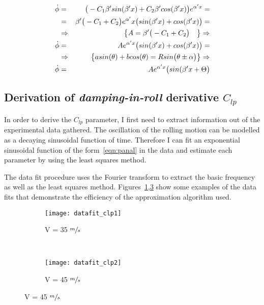 \begin{eqnarray}
    \dot{\phi} &=&   \big(-C_1 \beta' sin(\beta' x) + C_2 \beta' cos(\beta' x) \big) e^{\alpha' x} =\notag\\
     &=&  \beta'\big(-C_1+C_2\big)e^{\alpha'}x\big(sin(\beta'x) + cos(\beta'x)\big) = \notag\\
     &\Rightarrow& \big\{A = \beta' \big(-C_1+C_2\big) \quad \big\} \Rightarrow \notag\\
     \dot{\phi} &=& Ae^{\alpha'x}\big(sin(\beta'x) + cos(\beta'x)\big) \label{eqn:panal} = \notag\\
     &\Rightarrow&  \big\{asin(\theta) + bcos(\theta) = Rsin\big(\theta \pm \alpha\big)\big\}\Rightarrow \notag\\
     \dot{\phi} &=& Ae^{\alpha'x}\big(sin(\beta'x + \Theta \big) \label{eqn:panal} \label{eqn:panal}
\end{eqnarray}

\subsection{Derivation of \textit{damping-in-roll} derivative $C_{lp}$}

In order to derive the $C_{lp}$ parameter, I first need to extract information out of 
the experimental data gathered. The oscillation of the rolling motion can be modelled as a 
decaying sinusoidal function of time. Therefore I can fit an exponential sinusoidal function 
of the form~\ref{eqn:panal} in the data and estimate each parameter 
by using the least squares method.

The data fit procedure uses the Fourier transform to extract the basic frequency as well as the least squares method.
Figures~\ref{fig:datafit1},\ref{fig:datafit2} show some examples of the data fits that demonstrate the efficiency of the 
approximation algorithm used.

\begin{figure}[H]
        \centering
        \begin{subfigure}[b]{0.48\textwidth}
                \texttt{[image: datafit\_clp1]}
                \caption{V = 35 $\sfrac{m}{s}$}
                \label{fig:datafit1}
        \end{subfigure}%
        ~
        \begin{subfigure}[b]{0.48\textwidth}
                \texttt{[image: datafit\_clp2]}
                \caption{V = 45 $\sfrac{m}{s}$}
                \label{fig:datafit2}
        \end{subfigure}
\end{figure}

